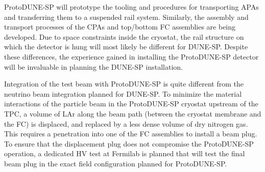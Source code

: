 {%

ProtoDUNE-SP will prototype the tooling and procedures for transporting APAs and transferring them to a suspended rail system. Similarly, the assembly and transport processes of the CPAs and top/bottom FC assemblies are being developed.  Due to space constraints inside the cryostat, the rail structure on which the detector is hung will most likely be different for DUNE-SP. Despite these differences, the experience gained in installing the ProtoDUNE-SP detector will be invaluable in planning the DUNE-SP installation. 


Integration of the test beam with ProtoDUNE-SP is quite different from the neutrino beam integration planned for DUNE-SP. To minimize the material interactions of the particle beam in the ProtoDUNE-SP cryostat upstream of the TPC, a volume of LAr along the beam path (between the cryostat membrane and the FC) is displaced, and replaced by a less dense volume of dry nitrogen gas. This requires a penetration into one of the FC assemblies to install a  beam plug. To ensure that the displacement plug does not compromise the ProtoDUNE-SP operation, a dedicated HV test at Fermilab is planned that will test the final beam plug in the exact field configuration planned for ProtoDUNE-SP.




}
